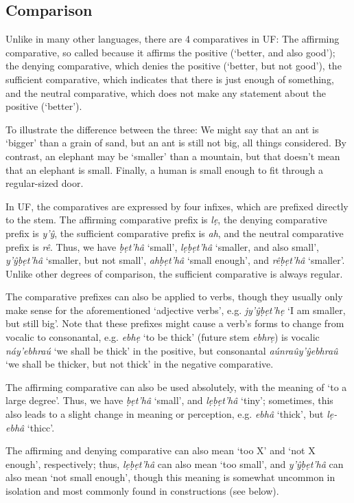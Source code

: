 \documentclass[a4paper, 12pt, twoside, openright, final]{book}
\let \w \textit
\begin{document}
\subsection{Comparison}\label{subsec:comparison}
Unlike in many other languages, there are 4 comparatives in UF: The affirming comparative, so called
because it affirms the positive (‘better, and also good’); the denying comparative, which denies the positive
(‘better, but not good’), the sufficient comparative, which indicates that there is just enough of something,
and the neutral comparative, which does not make any statement about the positive (‘better’).

To illustrate the difference between the three: We might say that an ant is ‘bigger’ than a grain of sand, but
an ant is still not big, all things considered. By contrast, an elephant may be ‘smaller’ than a mountain,
but that doesn’t mean that an elephant is small. Finally, a human is small enough to fit through a regular-sized
door.

In UF, the comparatives are expressed by four infixes, which are prefixed directly to the stem. The affirming
comparative prefix is \w{lẹ}, the denying comparative prefix is \w{y’ŷ}, the sufficient comparative prefix is \w{ah},
and the neutral comparative prefix is \w{rê}. Thus, we have \w{ḅẹt’hâ} ‘small’, \w{lẹḅẹt’hâ} ‘smaller, and also small’,
\w{y’ŷḅẹt’hâ} ‘smaller, but not small’, \w{ahḅẹt’hâ} ‘small enough’, and \w{rêḅẹt’hâ} ‘smaller’. Unlike other degrees
of comparison, the sufficient comparative is always regular.

The comparative prefixes can also be applied to verbs, though they usually only make sense for the aforementioned
‘adjective verbs’, e.g. \w{jy’ŷḅẹt’hẹ} ‘I am smaller, but still big’. Note that these prefixes
might cause a verb’s forms to change from vocalic to consonantal, e.g. \w{ebhẹ} ‘to be thick’ (future stem \w{ebhrẹ})
is vocalic \w{náy’ebhraú} ‘we shall be thick’ in the positive, but consonantal \w{aúnraûy’ŷebhraû} ‘we shall be
thicker, but not thick’ in the negative comparative.

The affirming comparative can also be used absolutely, with the meaning of ‘to a large degree’. Thus,
we have \w{ḅẹt’hâ} ‘small’, and \w{lẹḅẹt’hâ} ‘tiny’; sometimes, this also leads to a slight change in meaning
or perception, e.g. \w{ebhâ} ‘thick’, but \w{lẹ-ebhâ} ‘thicc’.

The affirming and denying comparative can also mean ‘too X’ and ‘not X enough’, respectively; thus, \w{lẹḅẹt’hâ}
can also mean ‘too small’, and \w{y’ŷḅẹt’hâ} can also mean ‘not small enough’, though this meaning is somewhat
uncommon in isolation and most commonly found in constructions (see below).
\end{document}
